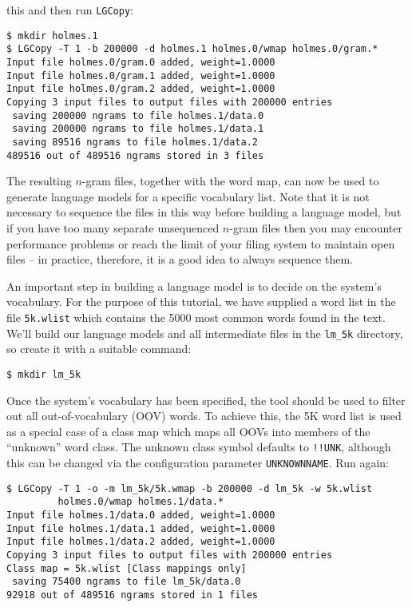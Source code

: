 this and then run {\tt LGCopy}:
\begin{verbatim}
$ mkdir holmes.1
$ LGCopy -T 1 -b 200000 -d holmes.1 holmes.0/wmap holmes.0/gram.*
Input file holmes.0/gram.0 added, weight=1.0000
Input file holmes.0/gram.1 added, weight=1.0000
Input file holmes.0/gram.2 added, weight=1.0000
Copying 3 input files to output files with 200000 entries
 saving 200000 ngrams to file holmes.1/data.0
 saving 200000 ngrams to file holmes.1/data.1
 saving 89516 ngrams to file holmes.1/data.2
489516 out of 489516 ngrams stored in 3 files
\end{verbatim}
The resulting $n$-gram files, together with the word map, can now be
used to generate language models for a specific vocabulary list.  Note
that it is not necessary to sequence the files in this way before
building a language model, but if you have too many separate
unsequenced $n$-gram files then you may encounter performance problems
or reach the limit of your filing system to maintain open files -- in
practice, therefore, it is a good idea to always sequence them.

An important step in building a language model is to decide on the
system's vocabulary. For the purpose of this tutorial, we have
supplied a word list in the file \texttt{5k.wlist} which contains the
5000 most common words found in the text.  We'll build our language
models and all intermediate files in the \texttt{lm\_5k} directory,
so create it with a suitable command:
\begin{verbatim}
$ mkdir lm_5k
\end{verbatim} %

Once the system's vocabulary has been specified, the tool
 should be used to filter out all out-of-vocabulary
(OOV) words.  To achieve this, the 5K word list is used as a special
case of a class map which maps all OOVs into members of the
``unknown'' word class.  The unknown class symbol defaults to
\texttt{!!UNK}, although this can be changed via the configuration
parameter \texttt{UNKNOWNNAME}.  Run  again:

\begin{verbatim}
$ LGCopy -T 1 -o -m lm_5k/5k.wmap -b 200000 -d lm_5k -w 5k.wlist 
         holmes.0/wmap holmes.1/data.*
Input file holmes.1/data.0 added, weight=1.0000
Input file holmes.1/data.1 added, weight=1.0000
Input file holmes.1/data.2 added, weight=1.0000
Copying 3 input files to output files with 200000 entries
Class map = 5k.wlist [Class mappings only]
 saving 75400 ngrams to file lm_5k/data.0
92918 out of 489516 ngrams stored in 1 files
\end{verbatim} %

